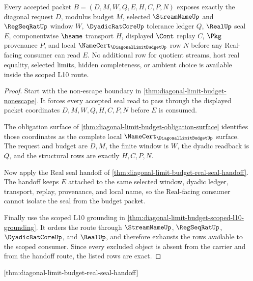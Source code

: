 \begin{theorem}
\label{thm:diagonal-limit-budget-scoped-row-exhaustion}
Every accepted packet $B=(D,M,W,Q,E,H,C,P,N)$ exposes exactly the diagonal request $D$, modulus budget $M$, selected $\StreamNameUp$ and $\RegSeqRatUp$ window $W$, $\DyadicRatCoreUp$ tolerance ledger $Q$, $\RealUp$ seal $E$, componentwise $\hsame$ transport $H$, displayed $\Cont$ replay $C$, $\Pkg$ provenance $P$, and local $\NameCert_{\DiagonalLimitBudgetUp}$ row $N$ before any Real-facing consumer can read $E$. No additional row for quotient streams, host real equality, selected limits, hidden completeness, or ambient choice is available inside the scoped L10 route.
\end{theorem}
\begin{proof}
Start with the non-escape boundary in \autoref{thm:diagonal-limit-budget-nonescape}. It forces every accepted seal read to pass through the displayed packet coordinates $D,M,W,Q,H,C,P,N$ before $E$ is consumed.

The obligation surface of \autoref{thm:diagonal-limit-budget-obligation-surface} identifies those coordinates as the complete local $\NameCert_{\DiagonalLimitBudgetUp}$ surface. The request and budget are $D,M$, the finite window is $W$, the dyadic readback is $Q$, and the structural rows are exactly $H,C,P,N$.

Now apply the Real seal handoff of \autoref{thm:diagonal-limit-budget-real-seal-handoff}. The handoff keeps $E$ attached to the same selected window, dyadic ledger, transport, replay, provenance, and local name, so the Real-facing consumer cannot isolate the seal from the budget packet.

Finally use the scoped L10 grounding in \autoref{thm:diagonal-limit-budget-scoped-l10-grounding}. It orders the route through $\StreamNameUp$, $\RegSeqRatUp$, $\DyadicRatCoreUp$, and $\RealUp$, and therefore exhausts the rows available to the scoped consumer. Since every excluded object is absent from the carrier and from the handoff route, the listed rows are exact.
\end{proof}

[thm:diagonal-limit-budget-real-seal-handoff]

